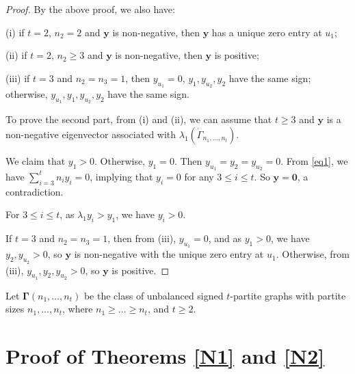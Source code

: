 \documentclass[10pt,a4paper]{amsart}
\numberwithin{equation}{section}
\begin{document}
\begin{proof}
By the above proof, we also have: 

(i)  if $t=2$, $n_2=2$ and $\mathbf{y}$ is non-negative, then   $\mathbf{y}$ has a unique zero entry at $u_1$;

(ii)  if $t=2$, $n_2\ge 3$ and $\mathbf{y}$ is non-negative, then   $\mathbf{y}$ is positive;


(iii) if $t=3$ and $n_2=n_3=1$, then $y_{u_1}=0$, $y_1, y_{u_2}, y_2$ have the same sign; otherwise, $y_{u_1}, y_1, y_{u_2}, y_2$ have the same sign. 


To prove the second part, from (i) and (ii), we can assume that $t\ge 3$ and  $\mathbf{y}$ is a non-negative eigenvector associated with $\lambda_1(\dot\Gamma_{n_1, \dots, n_t})$.




We claim that  $y_1>0$. Otherwise,  $y_1=0$. 
Then $y_{u_1}=y_2=y_{u_2}=0$. 
From \eqref{eq1}, we have $\sum_{i=3}^tn_iy_i=0$, implying that $y_i=0$ for any $3\le i\le t$. 
So $\mathbf{y}=\mathbf{0}$, a contradiction. 


For  $3\le i\le t$, as $\lambda_1y_i>y_1$, we have $y_i>0$. 




If $t=3$ and $n_2=n_3=1$, then from (iii), $y_{u_1}=0$, and as $y_1>0$, we have $y_2, y_{u_2}>0$,  
so $\mathbf{y}$ is non-negative with the unique zero entry at $u_1$. 
Otherwise, from (iii), $y_{u_1}, y_2, y_{u_2}>0$, so $\mathbf{y}$ is positive. 
\end{proof}

Let $\boldsymbol\Gamma(n_1,\dots, n_t)$ be the class of unbalanced signed $t$-partite graphs  with partite sizes $n_1, \dots, n_t$, where $n_1\ge \dots\ge n_t$, and $t\ge 2$.


\section{Proof of Theorems \ref{N1} and \ref{N2}}
\end{document}

